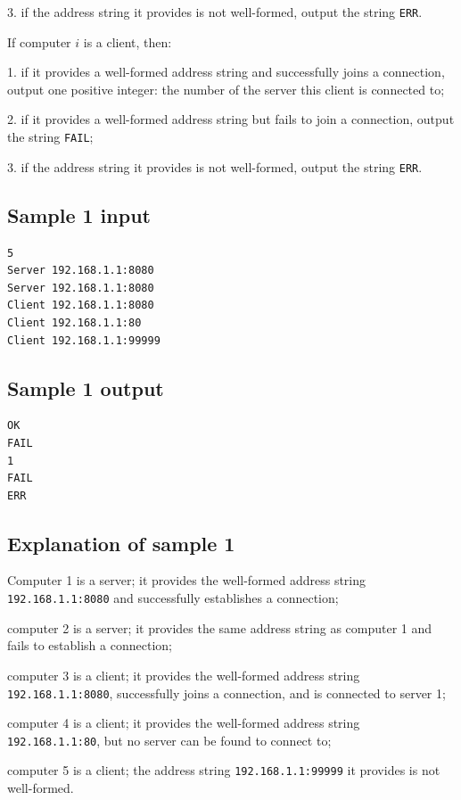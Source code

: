 \documentclass[11pt]{article}
\begin{document}
3. if the address string it provides is not well-formed, output the string
\texttt{ERR}.

If computer $i$ is a client, then:

1. if it provides a well-formed address string and successfully joins a
connection, output one positive integer: the number of the server this
client is connected to;

2. if it provides a well-formed address string but fails to join a
connection, output the string \texttt{FAIL};

3. if the address string it provides is not well-formed, output the string
\texttt{ERR}.

\subsection*{Sample 1 input}

\begin{verbatim}
5
Server 192.168.1.1:8080
Server 192.168.1.1:8080
Client 192.168.1.1:8080
Client 192.168.1.1:80
Client 192.168.1.1:99999
\end{verbatim}

\subsection*{Sample 1 output}

\begin{verbatim}
OK
FAIL
1
FAIL
ERR
\end{verbatim}

\subsection*{Explanation of sample 1}

Computer 1 is a server; it provides the well-formed address string
\texttt{192.168.1.1:8080} and successfully establishes a connection;

computer 2 is a server; it provides the same address string as computer 1
and fails to establish a connection;

computer 3 is a client; it provides the well-formed address string
\texttt{192.168.1.1:8080}, successfully joins a connection, and is
connected to server 1;

computer 4 is a client; it provides the well-formed address string
\texttt{192.168.1.1:80}, but no server can be found to connect to;

computer 5 is a client; the address string \texttt{192.168.1.1:99999} it
provides is not well-formed.
\end{document}
